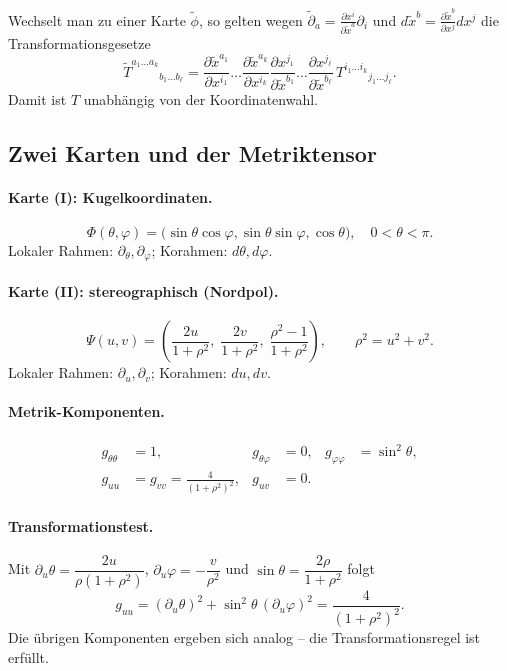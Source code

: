 \documentclass[10pt, letterpaper]{article}
\begin{document}
Wechselt man zu einer Karte $\tilde\phi$, so gelten wegen
\(
\tilde\partial_{a}
=\tfrac{\partial x^{i}}{\partial\tilde x^{a}}\partial_{i}
\)
und
\(
d\tilde x^{b}
=\tfrac{\partial\tilde x^{b}}{\partial x^{j}}dx^{j}
\)
die Transformationsgesetze
\[
  \tilde T^{a_{1}\dots a_{k}}{}_{b_{1}\dots b_{\ell}}
  =
   \frac{\partial \tilde x^{a_{1}}}{\partial x^{i_{1}}}\!\dots
   \frac{\partial \tilde x^{a_{k}}}{\partial x^{i_{k}}}
   \frac{\partial x^{j_{1}}}{\partial \tilde x^{b_{1}}}\!\dots
   \frac{\partial x^{j_{\ell}}}{\partial \tilde x^{b_{\ell}}}\,
   T^{i_{1}\dots i_{k}}{}_{j_{1}\dots j_{\ell}}.
\]
Damit ist $T$ unabhängig von der Koordinatenwahl.



\subsection*{Zwei Karten und der Metriktensor}

\paragraph{Karte (I): Kugelkoordinaten.}
\[
\Phi(\theta,\varphi)=\bigl(\sin\theta\cos\varphi,
                           \sin\theta\sin\varphi,
                           \cos\theta\bigr),\quad
0<\theta<\pi.
\]
Lokaler Rahmen: $\partial_\theta,\partial_\varphi$;
Korahmen: $d\theta,d\varphi$.

\paragraph{Karte (II): stereographisch (Nordpol).}
\[
\Psi(u,v)=\left(\frac{2u}{1+\rho^{2}},\;
                \frac{2v}{1+\rho^{2}},\;
                \frac{\rho^{2}-1}{1+\rho^{2}}\right),
\qquad \rho^{2}=u^{2}+v^{2}.
\]
Lokaler Rahmen: $\partial_{u},\partial_{v}$;
Korahmen: $du,dv$.

\paragraph{Metrik-Komponenten.}
\[
\begin{aligned}
g_{\theta\theta}&=1,& g_{\theta\varphi}&=0,&
g_{\varphi\varphi}&=\sin^{2}\theta,\\[4pt]
g_{uu}&=g_{vv}=\frac{4}{(1+\rho^{2})^{2}},&
g_{uv}&=0.
\end{aligned}
\]

\paragraph{Transformationstest.}
Mit
$\partial_u\theta=\dfrac{2u}{\rho(1+\rho^{2})}$,
$\partial_u\varphi=-\dfrac{v}{\rho^{2}}$
und
$\sin\theta=\dfrac{2\rho}{1+\rho^{2}}$
folgt
\[
g_{uu}
=(\partial_u\theta)^{2}
  +\sin^{2}\theta\,(\partial_u\varphi)^{2}
=\frac{4}{(1+\rho^{2})^{2}}.
\]
Die übrigen Komponenten ergeben sich analog – die
Transformationsregel ist erfüllt.
\end{document}
